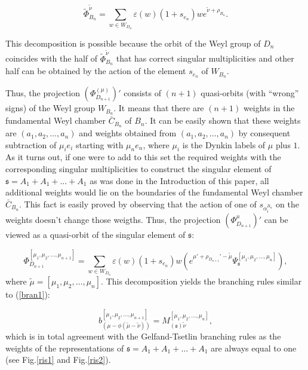 \documentclass[12pt]{article}
\newcommand{\sfr}{\mathfrak{s}}
\begin{document}
\begin{equation}
\tilde\Phi^{\tilde\nu}_{B_n}=\sum_{w\in W_{D_n}} \varepsilon(w) (1+s_{e_n})w e^{\tilde\nu+\rho_{B_n}}.
\end{equation}

This decomposition is possible because the orbit of the Weyl group of $D_n$ coincides with the half
of $\tilde\Phi^{\tilde\nu}_{B_n}$ that has correct singular multiplicities and other half can be
obtained by the action of the element $s_{e_n}$ of $W_{B_{n}}$.

Thus, the projection $(\Phi^{(\mu)}_{D_{n+1}})'$ consists of $(n+1)$ quasi-orbits (with ``wrong'' signs) of the Weyl group
$W_{B_{n}}$. It means that there are $(n+1)$ weights in the fundamental Weyl chamber $\bar C_{B_n}$
of $B_n$. It can be easily shown that these weights are $(a_1,a_2,\dots,a_{n})$ and weights obtained
from $(a_1,a_2,\dots,a_{n})$ by consequent subtraction of $\mu_i e_i$ starting with $\mu_n e_n$,
where $\mu_i$ is the Dynkin labels of $\mu$ plus $1$. As it turns out, if one were to add to this set
the required weights with the corresponding singular multiplicities to construct the singular element of
$\sfr=A_1+A_1+\dots+A_1$ as was done in the Introduction of this paper, all additional weights would
lie on the boundaries of the fundamental Weyl chamber $\bar C_{B_n}$. This fact is easily proved by
observing that the action of one of $s_{\alpha_i^{B_n}}$ on the weights doesn't change those
weigths. Thus, the projection $(\Phi^{\mu}_{D_{n+1}})'$ can be viewed as a quasi-orbit of the
singular element of $\sfr$:

\begin{equation}
\Phi^{[\mu_1,\mu_2,\dots,\mu_{n+1}]}_{D_{n+1}}=\sum_{w\in W_{D_n}} \varepsilon(w) (1+s_{e_n})w (e^{\mu'+\rho_{D_{n+1}}'-\tilde\mu}\Psi^{[\mu_1,\mu_2,\dots,\mu_{n}]}_{\sfr}),
\end{equation}
where $\tilde\mu=[\mu_1,\mu_2,\dots,\mu_{n}]$. This decomposition yields the branching rules similar to (\ref{bran1}):

\begin{equation}
b_{\left( \mu -\phi \left( \widetilde{\mu }-\widetilde{\nu }\right) \right)
}^{[\mu_1,\mu_2,\dots,\mu_{n+1}]}=M_{\left( \sfr\right) \widetilde{\nu }}^{[\mu_1,\mu_2,\dots,\mu_{n}]}, 
\label{bran11}
\end{equation}
which is in total agreement with the Gelfand-Tsetlin branching rules as the weights of the representations of $\sfr=A_1+A_1+\dots+A_1$ are always equal to one (see Fig.\ref{ris1} and Fig.\ref{ris2}).
\end{document}
